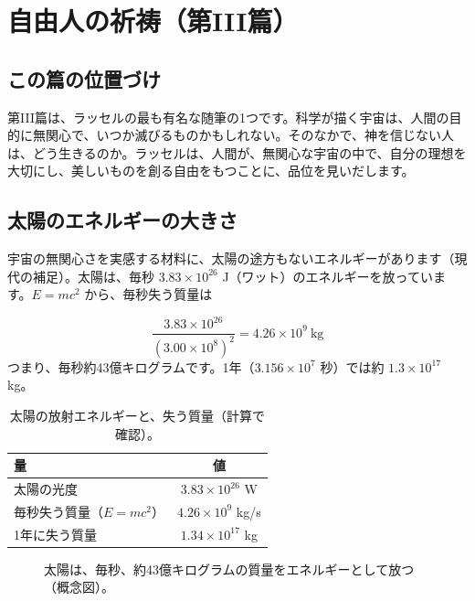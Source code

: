 \documentclass[a4paper,11pt,openany]{ltjsbook}
\begin{document}
\chapter{自由人の祈祷（第III篇）}

\section{この篇の位置づけ}

第III篇は、ラッセルの最も有名な随筆の1つです。科学が描く宇宙は、人間の目的に無関心で、いつか滅びるものかもしれない。そのなかで、神を信じない人は、どう生きるのか。ラッセルは、人間が、無関心な宇宙の中で、自分の理想を大切にし、美しいものを創る自由をもつことに、品位を見いだします。

\section{太陽のエネルギーの大きさ}

宇宙の無関心さを実感する材料に、太陽の途方もないエネルギーがあります（現代の補足）。太陽は、毎秒 $3.83\times10^{26}$ J（ワット）のエネルギーを放っています。$E=mc^2$ から、毎秒失う質量は

\[
\frac{3.83\times10^{26}}{(3.00\times10^{8})^2}=4.26\times10^{9}\ \text{kg}
\]
つまり、毎秒約43億キログラムです。1年（$3.156\times10^7$ 秒）では約 $1.3\times10^{17}$ kg。

\begin{table}[htbp]
\centering
\begin{tabular}{lc}
\toprule
量 & 値\\
\midrule
太陽の光度 & $3.83\times10^{26}$ W\\
毎秒失う質量（$E=mc^2$） & $4.26\times10^{9}$ kg/s\\
1年に失う質量 & $1.34\times10^{17}$ kg\\
\bottomrule
\end{tabular}
\caption{太陽の放射エネルギーと、失う質量（計算で確認）。}
\end{table}

\begin{figure}[htbp]
\centering
{}
\caption{太陽は、毎秒、約43億キログラムの質量をエネルギーとして放つ（概念図）。}
\end{figure}
\end{document}
